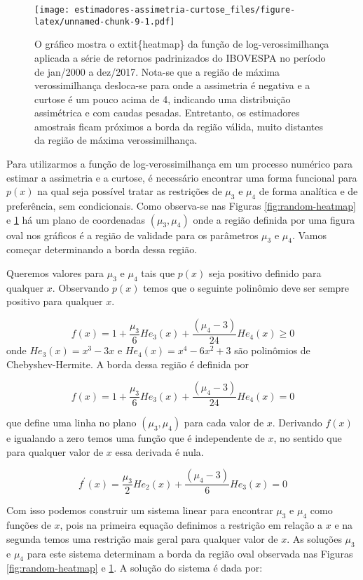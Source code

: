 \documentclass[]{article}
\begin{document}
\begin{figure}
\centering
\texttt{[image: estimadores-assimetria-curtose\_files/figure-latex/unnamed-chunk-9-1.pdf]}
\caption{\label{fig:ibovespa-heatmap} O gráfico mostra o
extit\{heatmap\} da função de log-verossimilhança aplicada a série de
retornos padrinizados do IBOVESPA no período de jan/2000 a dez/2017.
Nota-se que a região de máxima verossimilhança desloca-se para onde a
assimetria é negativa e a curtose é um pouco acima de 4, indicando uma
distribuição assimétrica e com caudas pesadas. Entretanto, os
estimadores amostrais ficam próximos a borda da região válida, muito
distantes da região de máxima verossimilhança.}
\end{figure}

Para utilizarmos a função de log-verossimilhança em um processo numérico
para estimar a assimetria e a curtose, é necessário encontrar uma forma
funcional para \(p(x)\) na qual seja possível tratar as restrições de
\(\mu_3\) e \(\mu_4\) de forma analítica e de preferência, sem
condicionais. Como observa-se nas Figuras \ref{fig:random-heatmap} e
\ref{fig:ibovespa-heatmap} há um plano de coordenadas \((\mu_3, \mu_4)\)
onde a região definida por uma figura oval nos gráficos é a região de
validade para os parâmetros \(\mu_3\) e \(\mu_4\). Vamos começar
determinando a borda dessa região.

Queremos valores para \(\mu_3\) e \(\mu_4\) tais que \(p(x)\) seja
positivo definido para qualquer \(x\). Observando \(p(x)\) temos que o
seguinte polinômio deve ser sempre positivo para qualquer \(x\).

\[
f(x) = 1 + \frac{\mu_3}{6} He_3(x) + \frac{(\mu_4 - 3)}{24} He_4(x) \geq 0
\] onde \(He_3(x) = x^3 - 3x\) e \(He_4(x) = x^4 - 6x^2 + 3\) são
polinômios de Chebyshev-Hermite. A borda dessa região é definida por

\[
f(x) = 1 + \frac{\mu_3}{6} He_3(x) + \frac{(\mu_4 - 3)}{24} He_4(x) = 0
\]

que define uma linha no plano \((\mu_3, \mu_4)\) para cada valor de
\(x\). Derivando \(f(x)\) e igualando a zero temos uma função que é
independente de \(x\), no sentido que para qualquer valor de \(x\) essa
derivada é nula.

\[
f^\prime(x) = \frac{\mu_3}{2} He_2(x) + \frac{(\mu_4 - 3)}{6} He_3(x) = 0
\]

Com isso podemos construir um sistema linear para encontrar \(\mu_3\) e
\(\mu_4\) como funções de \(x\), pois na primeira equação definimos a
restrição em relação a \(x\) e na segunda temos uma restrição mais geral
para qualquer valor de \(x\). As soluções \(\mu_3\) e \(\mu_4\) para
este sistema determinam a borda da região oval observada nas Figuras
\ref{fig:random-heatmap} e \ref{fig:ibovespa-heatmap}. A solução do
sistema é dada por:
\end{document}
